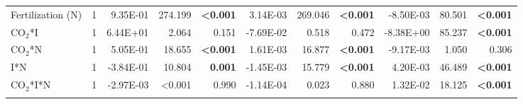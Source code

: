 \begin{landscape}
\begin{table}[]
{\begin{tabular}{p{3cm}p{0.5cm}p{1.75cm}p{1.5cm}p{1.5cm}p{1.75cm}p{1.5cm}p{1.5cm}p{1.75cm}p{1.5cm}p{1.5cm}}
            Fertilization (N) & \multicolumn{1}{r}{1}
            & \multicolumn{1}{r}{9.35E-01}      & \multicolumn{1}{r}{274.199}       & \multicolumn{1}{r}{\textbf{<0.001}}
            & \multicolumn{1}{r}{3.14E-03}      & \multicolumn{1}{r}{269.046}       & \multicolumn{1}{r}{\textbf{<0.001}}
            & \multicolumn{1}{r}{-8.50E-03}     & \multicolumn{1}{r}{80.501}        & \multicolumn{1}{r}{\textbf{<0.001}} 
            \\

            CO$_2$*I & \multicolumn{1}{r}{1}
            & \multicolumn{1}{r}{6.44E+01}      & \multicolumn{1}{r}{2.064}         & \multicolumn{1}{r}{0.151}
            & \multicolumn{1}{r}{-7.69E-02}     & \multicolumn{1}{r}{0.518}         & \multicolumn{1}{r}{0.472}
            & \multicolumn{1}{r}{-8.38E+00}     & \multicolumn{1}{r}{85.237}        & \multicolumn{1}{r}{\textbf{<0.001}} 
            \\

            CO$_2$*N & \multicolumn{1}{r}{1}
            & \multicolumn{1}{r}{5.05E-01}      & \multicolumn{1}{r}{18.655}        & \multicolumn{1}{r}{\textbf{<0.001}}
            & \multicolumn{1}{r}{1.61E-03}      & \multicolumn{1}{r}{16.877}        & \multicolumn{1}{r}{\textbf{<0.001}}
            & \multicolumn{1}{r}{-9.17E-03}     & \multicolumn{1}{r}{1.050}         & \multicolumn{1}{r}{0.306} 
            \\

            I*N & \multicolumn{1}{r}{1}
            & \multicolumn{1}{r}{-3.84E-01}     & \multicolumn{1}{r}{10.804}        & \multicolumn{1}{r}{\textbf{0.001}}
            & \multicolumn{1}{r}{-1.45E-03}     & \multicolumn{1}{r}{15.779}        & \multicolumn{1}{r}{\textbf{<0.001}}
            & \multicolumn{1}{r}{4.20E-03}      & \multicolumn{1}{r}{46.489}        & \multicolumn{1}{r}{\textbf{<0.001}} 
            \\

            CO$_2$*I*N & \multicolumn{1}{r}{1}
            & \multicolumn{1}{r}{-2.97E-03}     & \multicolumn{1}{r}{<0.001}        & \multicolumn{1}{r}{0.990}
            & \multicolumn{1}{r}{-1.14E-04}     & \multicolumn{1}{r}{0.023}         & \multicolumn{1}{r}{0.880}
            & \multicolumn{1}{r}{1.32E-02}      & \multicolumn{1}{r}{18.125}        & \multicolumn{1}{r}{\textbf{<0.001}} 
            \\
            \hline

            &&&&&&&&&&
            \\


\end{tabular}}
\end{table}
\end{landscape}
